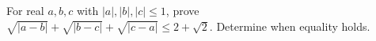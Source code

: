 For real $a,b,c$ with $|a|,|b|,|c|\le1$, prove $\sqrt{|a-b|}+\sqrt{|b-c|}+\sqrt{|c-a|}\le2+\sqrt2$. Determine when equality holds.
